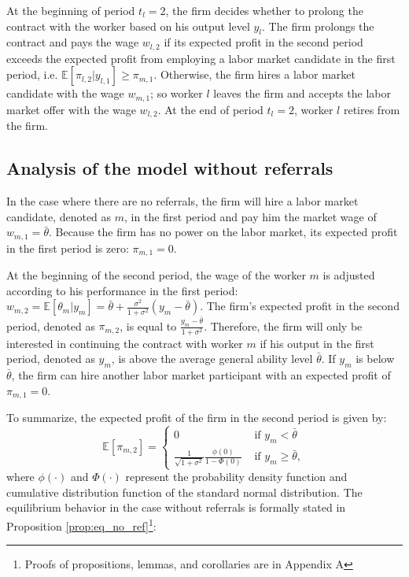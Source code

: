 \documentclass[12pt]{article}
\begin{document}
At the beginning of period $t_l =2$, the firm decides whether to prolong the contract with the worker based on his output level $y_l$. The firm prolongs the contract and pays the wage $w_{l,2}$ if its expected profit in the second period exceeds the expected profit from employing a labor market candidate in the first period, i.e. $\mathbb{E}[\pi_{l,2}|y_{l,1}] \geq \pi_{m,1}$. Otherwise, the firm hires a labor market candidate with the wage $w_{m,1}$; so worker $l$ leaves the firm and accepts the labor market offer with the wage $w_{l,2}$. At the end of period $t_l = 2$, worker $l$ retires from the firm.

\subsection{Analysis of the model without referrals}

In the case where there are no referrals, the firm will hire a labor market candidate, denoted as $m$, in the first period and pay him the market wage of $w_{m,1} = \bar{\theta}$. Because the firm has no power on the labor market, its expected profit in the first period is zero: $\pi_{m,1} = 0$.

At the beginning of the second period, the wage of the worker $m$ is adjusted according to his performance in the first period: $w_{m,2} = \mathbb{E}[\theta_m|y_m] = \bar{\theta} + \frac{\sigma^2}{1+\sigma^2}(y_m-\bar{\theta})$. The firm's expected profit in the second period, denoted as $\pi_{m,2}$, is equal to $\frac{y_m-\bar{\theta}}{1+\sigma^2}$. Therefore, the firm will only be interested in continuing the contract with worker $m$ if his output in the first period, denoted as $y_m$, is above the average general ability level $\bar{\theta}$. If $y_m$ is below $\bar{\theta}$, the firm can hire another labor market participant with an expected profit of $\pi_{m,1}=0$.

To summarize, the expected profit of the firm in the second period is given by:
\begin{equation}
    \mathbb{E}[\pi_{m,2}]= 
    \begin{cases}
        0 & \text{ if } y_m < \bar{\theta}\\
        \frac{1}{\sqrt{1 + \sigma^2}}\frac{\phi(0)}{1-\Phi(0)} & \text{ if } y_m \geq \bar{\theta},
    \end{cases}
\end{equation}
where $\phi(\cdot)$ and $\Phi(\cdot)$ represent the probability density function and cumulative distribution function of the standard normal distribution. The equilibrium behavior in the case without referrals is formally stated in Proposition \ref{prop:eq_no_ref}\footnote{Proofs of propositions, lemmas, and corollaries are in Appendix A}:
\end{document}
